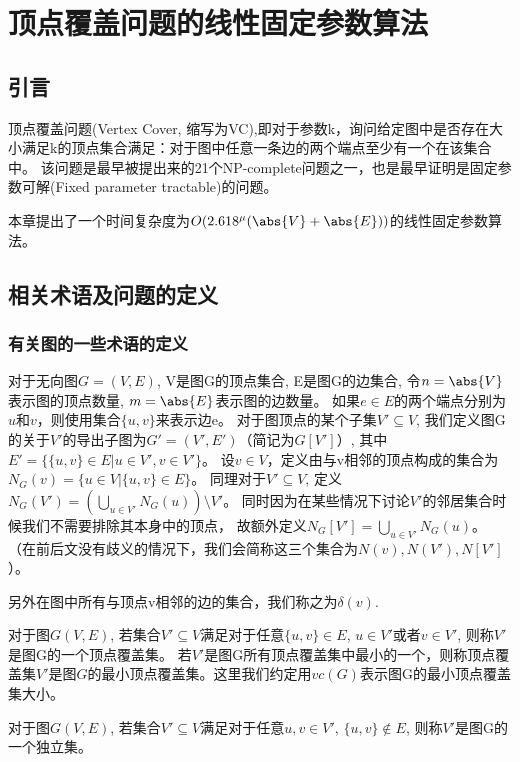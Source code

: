 \chapter{顶点覆盖问题的线性固定参数算法}
\section{引言}
顶点覆盖问题(Vertex Cover, 缩写为VC),即对于参数k，询问给定图中是否存在大小满足k的顶点集合满足：对于图中任意一条边的两个端点至少有一个在该集合中。
该问题是最早被提出来的21个NP-complete问题之一\cite{karp1972reducibility}，也是最早证明是固定参数可解(Fixed parameter tractable)的问题\cite{downey2012parameterized}。

本章提出了一个时间复杂度为$O(2.618^{\mu}(\abs{V} + \abs{E}))$的线性固定参数算法。

\section{相关术语及问题的定义}
\subsection{有关图的一些术语的定义}
对于无向图$G=(V,E)$, V是图G的顶点集合, E是图G的边集合, 令$n = \abs{V}$表示图的顶点数量, $m = \abs{E}$表示图的边数量。
如果$e \in E$的两个端点分别为$u$和$v$，则使用集合$\{u, v \}$来表示边e。
对于图顶点的某个子集$V' \subseteq V$, 我们定义图G的关于$V'$的导出子图为$G' = (V', E')$（简记为$G[V']$）, 其中$E' = \{\{u, v\} \in E| u \in V', v \in V' \}$。
设$v \in V$，定义由与v相邻的顶点构成的集合为$N_{G}(v) = \{ u \in V | \{u, v\} \in E\}$。
同理对于$V' \subseteq V$, 定义$N_{G}(V') = (\bigcup_{u \in V'}N_{G}(u)) \setminus V' $。
同时因为在某些情况下讨论$V'$的邻居集合时候我们不需要排除其本身中的顶点，
故额外定义$N_{G}[V'] = \bigcup_{u \in V'}N_{G}(u)$。
（在前后文没有歧义的情况下，我们会简称这三个集合为$N(v), N(V'),N[V']$）。

另外在图中所有与顶点v相邻的边的集合，我们称之为$\delta(v)$.

\begin{definition}[顶点覆盖集]
对于图$G(V, E)$, 若集合$V' \subseteq V$满足对于任意$\{u, v\} \in E$, $u \in V'$或者$v \in V'$, 则称$V'$是图G的一个顶点覆盖集。
若$V'$是图G所有顶点覆盖集中最小的一个，则称顶点覆盖集$V'$是图$G$的最小顶点覆盖集。这里我们约定用$vc(G)$表示图G的最小顶点覆盖集大小。
\end{definition}

\begin{definition}[独立集]
对于图$G(V, E)$, 若集合$V' \subseteq V$满足对于任意$u, v \in V'$, $\{u, v\} \notin E$, 则称$V'$是图G的一个独立集。
\end{definition}


